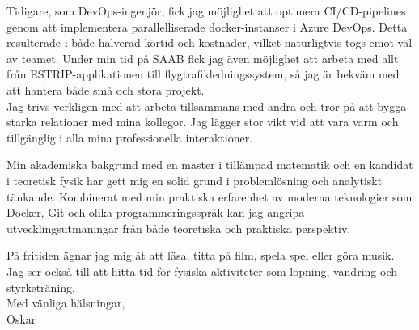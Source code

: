 \documentclass[lighthipster]{simplehipstercv}
\newlength{\rightcolwidth}
\begin{document}
\begin{paracol}{2}
\begin{minipage}[t]{0.71\textwidth}
Tidigare, som DevOps-ingenjör, fick jag möjlighet att optimera CI/CD-pipelines genom att implementera parallelliserade docker-instanser i Azure DevOps. Detta resulterade i både halverad körtid och kostnader, vilket naturligtvis togs emot väl av teamet. Under min tid på SAAB fick jag även möjlighet att arbeta med allt från ESTRIP-applikationen till flygtrafikledningssystem, så jag är bekväm med att hantera både små och stora projekt.\\

Jag trivs verkligen med att arbeta tillsammans med andra och tror på att bygga starka relationer med mina kollegor. Jag lägger stor vikt vid att vara varm och tillgänglig i alla mina professionella interaktioner.

Min akademiska bakgrund med en master i tillämpad matematik och en kandidat i teoretisk fysik har gett mig en solid grund i problemlösning och analytiskt tänkande. Kombinerat med min praktiska erfarenhet av moderna teknologier som Docker, Git och olika programmeringsspråk kan jag angripa utvecklingsutmaningar från både teoretiska och praktiska perspektiv.

På fritiden ägnar jag mig åt att läsa, titta på film, spela spel eller göra musik. Jag ser också till att hitta tid för fysiska aktiviteter som löpning, vandring och styrketräning.
\\
Med vänliga hälsningar,\\
Oskar
\end{minipage}

\bigskip


\vfill{} %

\setlength{\parindent}{0pt}
\begin{minipage}[t]{\rightcolwidth}
\begin{center}\fontfamily{\sfdefault}\selectfont \color{black!70}
\end{center}
\end{minipage}

\end{paracol}
\end{document}
